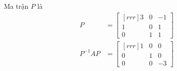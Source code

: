 \documentclass{article}
\begin{document}
    \begin{minipage}{0.45\linewidth}
    Ma trận $P$ là
    \begin{equation*}
        \begin{split}
            P  &= \begin{bmatrix}[rrr]
        3 & 0 & -1 \\
        1 & 0 & 1 \\
        0 & 1 & 1 
    \end{bmatrix}  \\
        P^{-1}AP &= \begin{bmatrix}[rrr]
            1 & 0 & 0 \\
            0 & 1 & 0 \\
            0 & 0 & -3 
        \end{bmatrix} 
        \end{split}
    \end{equation*}

        
    \end{minipage}
\end{document}
